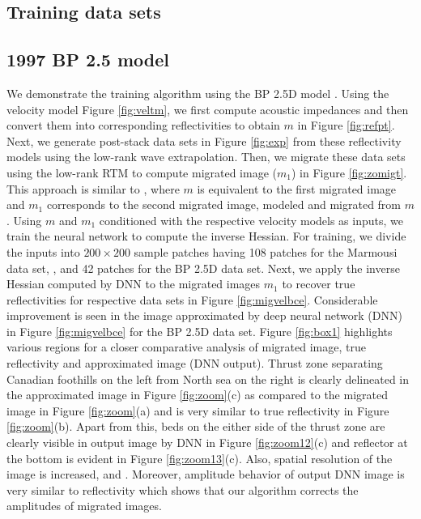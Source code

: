 \subsection{Training data sets}

\subsection{1997 BP 2.5 model}
\hspace{\parindent} We demonstrate the training algorithm using the BP 2.5D model \cite[]{etgen1998strike} . Using the velocity model Figure \ref{fig:veltm}, we first compute acoustic impedances and then convert them into corresponding reflectivities to obtain $m$ in Figure \ref{fig:refpt}. Next, we generate post-stack data sets in Figure \ref{fig:exp} from these reflectivity models using the low-rank wave extrapolation. Then, we migrate these data sets using the low-rank  RTM \cite[]{fomel2013seismic} to compute migrated image ($m_1$) in Figure \ref{fig:zomigt}. This approach is similar to \cite[]{guitton2004amplitude}, where $m$ is equivalent to the first migrated image and $m_1$ corresponds to the second migrated image, modeled and migrated from $m$. Using $m$ and $m_1$ conditioned with the respective velocity models as inputs, we train the neural network to compute the inverse Hessian. For training, we divide the inputs into $200\times200$ sample patches having 108 patches for the Marmousi data set,  , and 42 patches for the BP 2.5D data set. Next, we apply the inverse Hessian computed by DNN to the migrated images $m_1$ to recover true reflectivities for respective data sets in Figure \ref{fig:migvelbce}. Considerable improvement is seen in the image approximated by deep neural network (DNN) in Figure \ref{fig:migvelbce} for the BP 2.5D data set. Figure \ref{fig:box1} highlights various regions for a closer comparative analysis of migrated image, true reflectivity and approximated image (DNN output). Thrust zone separating Canadian foothills on the left from North sea on the right \cite[]{etgen1998strike} is clearly delineated in the approximated image in Figure \ref{fig:zoom}(c) as compared to the migrated image in Figure \ref{fig:zoom}(a) and is very similar to true reflectivity in Figure \ref{fig:zoom}(b). Apart from this, beds on the either side of the thrust zone are clearly visible in output image by DNN in Figure \ref{fig:zoom12}(c) and reflector at the bottom is evident in Figure \ref{fig:zoom13}(c). Also, spatial resolution of the image is increased, and  . Moreover, amplitude behavior of output DNN image is very similar to reflectivity which shows that our algorithm corrects the amplitudes of migrated images.        

